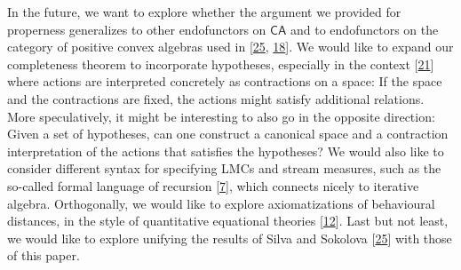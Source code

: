\par\medskip
\hypertarget{html:S8.p3}{} In the future, we want to explore whether the argument we provided for properness generalizes to other endofunctors on %
\hypertarget{html:S8.p3.m1}{}\({\mathsf{CA}}\) and to endofunctors on the category of positive convex algebras used in [\hyperlink{html:bib.bib25}{25}, \hyperlink{html:bib.bib18}{18}]. We would like to expand our completeness theorem to incorporate hypotheses, especially in the context [\hyperlink{html:bib.bib21}{21}] where actions are interpreted concretely as contractions on a space: If the space and the contractions are fixed, the actions might satisfy additional relations. More speculatively, it might be interesting to also go in the opposite direction: Given a set of hypotheses, can one construct a canonical space and a contraction interpretation of the actions that satisfies the hypotheses? We would also like to consider different syntax for specifying LMCs and stream measures, such as the so-called formal language of recursion [\hyperlink{html:bib.bib7}{7}], which connects nicely to iterative algebra. Orthogonally, we would like to explore axiomatizations of behavioural distances, in the style of quantitative equational theories [\hyperlink{html:bib.bib12}{12}]. Last but not least, we would like to explore unifying the results of Silva and Sokolova [\hyperlink{html:bib.bib25}{25}] with those of this paper.
\par\medskip
  
